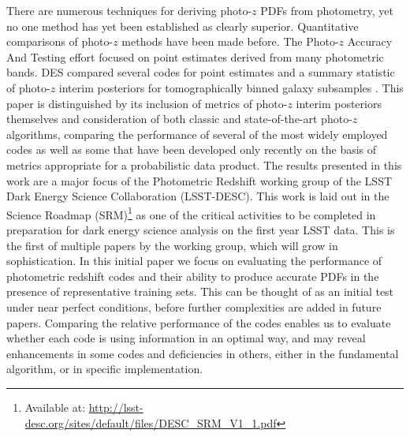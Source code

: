 \documentclass[usenatbib]{mn2e}
\begin{document}
There are numerous techniques for deriving photo-$z$ PDFs from photometry, yet no one method has yet been established as clearly superior.
Quantitative comparisons of photo-$z$ methods have been made before.  
The Photo-$z$ Accuracy And Testing \citep[PHAT,][]{Hildebrandt:10} effort focused on point estimates derived from many photometric bands. 
DES compared several codes for point estimates \citep{Sanchez:14} and a summary statistic of photo-$z$ interim posteriors for tomographically binned galaxy subsamples \citep{Bonnett:16}. 
This paper is distinguished by its inclusion of metrics of photo-$z$ interim posteriors themselves and consideration of both classic and state-of-the-art photo-$z$ algorithms, comparing the performance of several of the most widely employed codes as well as some that have been developed only recently on the basis of metrics appropriate for a probabilistic data product. 
The results presented in this work are 
 a major focus of the Photometric Redshift working group of the LSST Dark Energy Science Collaboration (LSST-DESC).  This work is laid out in the Science Roadmap (SRM)\footnote{Available at: \url{http://lsst-desc.org/sites/default/files/DESC_SRM_V1_1.pdf}} as one of the critical activities to be completed in preparation for dark energy science analysis on the first year LSST data. 
This is the first of multiple papers by the working group, which will grow in sophistication.
In this initial paper we focus on evaluating the performance of photometric redshift codes and their ability to produce accurate PDFs in the presence of representative training sets.  This can be thought of as an initial test under near perfect conditions, before further complexities are added in future papers.  Comparing the relative performance of the codes enables us to evaluate whether each code is using information in an optimal way, and may reveal enhancements in some codes and deficiencies in others, either in the fundamental algorithm, or in specific implementation. 
\end{document}
